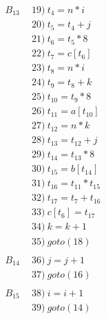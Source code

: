 \documentclass[UTF8,noindent]{ctexart}
\begin{document}
\begin{align*}
B_{13}\ \ &19)\ t_4 = n*i\\
&20)\ t_5 = t_4+j\\
&21)\ t_6 = t_5*8\\
&22)\ t_7 = c[t_6]\\
&23)\ t_8 = n*i\\
&24)\ t_9 = t_8 + k\\
&25)\ t_{10} = t_9*8\\
&26)\ t_{11} = a[t_{10}]\\
&27)\ t_{12} = n*k\\
&28)\ t_{13} = t_{12} + j\\
&29)\ t_{14} = t_{13}*8\\
&30)\ t_{15} = b[t_{14}]\\
&31)\ t_{16} = t_{11} * t_{15}\\
&32)\ t_{17} = t_7 + t_{16}\\
&33)\ c[t_6] = t_{17}\\
&34)\ k = k+1\\
&35)\ goto(18)\\
&\\
B_{14}\ \ &36)\ j= j+1\\
&37)\ goto(16)\\
&\\
B_{15}\ \ &38) \ i = i+1\\
&39)\ goto(14)
\end{align*}
\end{document}
